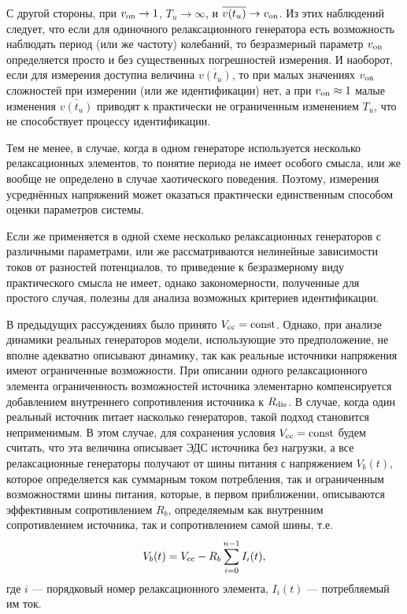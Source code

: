 С другой стороны, при $v_\mathrm{on} \to 1$, $T_u \to \infty$,
и
$ \overline{v(t_u)} \to v_\mathrm{on}$.
Из этих наблюдений следует, что если для одиночного релаксационного генератора
есть возможность наблюдать период (или же частоту) колебаний,
то безразмерный параметр $v_\mathrm{on}$ определяется просто и без
существенных погрешностей измерения. И наоборот,
если для измерения доступна величина $\overline{v(t_u)}$,
то при малых значениях $v_\mathrm{on}$ сложностей при измерении (или же идентификации) нет,
а при $v_\mathrm{on} \approx 1$ малые изменения $\overline{v(t_u)}$
приводят к практически не ограниченным изменением $T_u$,
что не способствует процессу идентификации.

Тем не менее, в случае, когда в одном генераторе используется
несколько релаксационных элементов,
то понятие периода не имеет особого смысла, или же вообще не
определено в случае хаотического поведения. Поэтому,
измерения усреднённых напряжений может оказаться практически
единственным способом оценки параметров системы.


Если же применяется в одной схеме несколько релаксационных генераторов с различными параметрами,
или же рассматриваются нелинейные зависимости токов от разностей потенциалов,
то приведение к безразмерному виду практического смысла не имеет,
однако закономерности, полученные для простого случая,
полезны для анализа возможных критериев идентификации.


В предыдущих рассуждениях было принято $V_\mathrm{cc} = \mathrm{const}$.
Однако, при анализе динамики реальных генераторов
модели, использующие
это предположение,
не вполне адекватно описывают динамику, так как реальные
источники напряжения имеют ограниченные возможности.
При описании одного релаксационного элемента
ограниченность возможностей источника элементарно компенсируется
добавлением внутреннего сопротивления источника к $R_\mathrm{dis}$.
В случае, когда один реальный источник питает
насколько генераторов, такой подход становится неприменимым.
В этом случае, для сохранения условия  $V_\mathrm{cc} = \mathrm{const}$
будем считать, что эта величина описывает ЭДС источника
без нагрузки, а все релаксационные генераторы
получают от шины питания с напряжением $V_b(t)$,
которое определяется как суммарным током потребления,
так и ограниченным возможностями шины питания,
которые, в первом приближении, описываются
эффективным сопротивлением $R_b$, определяемым как внутренним сопротивлением
источника, так и сопротивлением самой шины, т.е.
%
\begin{equation}
  V_b(t) = V_\mathrm{cc} - R_b \sum\limits_{i=0}^{n-1} I_i(t),
  \label{atu:eq:V_b_relax}
\end{equation}
%
где $i$ --- порядковый номер релаксационного элемента,
$I_i(t)$ --- потребляемый им ток.


